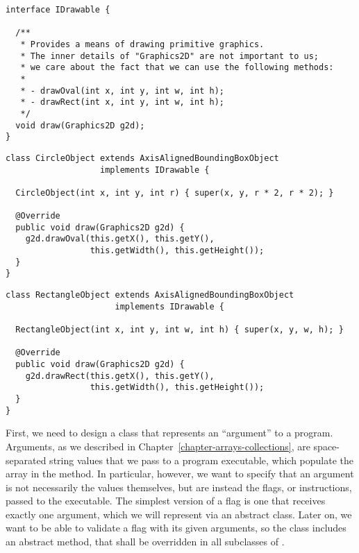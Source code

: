 \begin{lstlisting}[language=MyJava]
interface IDrawable {
  
  /**
   * Provides a means of drawing primitive graphics.
   * The inner details of "Graphics2D" are not important to us; 
   * we care about the fact that we can use the following methods:
   * 
   * - drawOval(int x, int y, int w, int h);
   * - drawRect(int x, int y, int w, int h);
   */
  void draw(Graphics2D g2d); 
}
\end{lstlisting} 

\begin{lstlisting}[language=MyJava]
class CircleObject extends AxisAlignedBoundingBoxObject 
                   implements IDrawable {
  
  CircleObject(int x, int y, int r) { super(x, y, r * 2, r * 2); }

  @Override
  public void draw(Graphics2D g2d) {
    g2d.drawOval(this.getX(), this.getY(), 
                 this.getWidth(), this.getHeight());
  }
}
\end{lstlisting}

\begin{lstlisting}[language=MyJava]
class RectangleObject extends AxisAlignedBoundingBoxObject 
                      implements IDrawable {
  
  RectangleObject(int x, int y, int w, int h) { super(x, y, w, h); }
  
  @Override
  public void draw(Graphics2D g2d) {
    g2d.drawRect(this.getX(), this.getY(), 
                 this.getWidth(), this.getHeight());
  }
}
\end{lstlisting}


First, we need to design a class that represents an ``argument'' to a program. Arguments, as we described in Chapter~\ref{chapter-arrays-collections}, are space-separated string values that we pass to a program executable, which populate the  array in the  method. In particular, however, we want to specify that an argument is not necessarily the values themselves, but are instead the flags, or instructions, passed to the executable. The simplest version of a flag is one that receives exactly one argument, which we will represent via an abstract  class. Later on, we want to be able to validate a flag with its given arguments, so the  class includes an abstract  method, that shall be overridden in all subclasses of .

